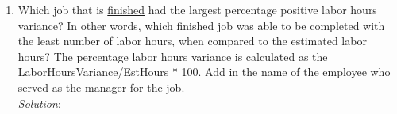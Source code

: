 \documentclass{article}
\begin{document}
\begin{enumerate}

  \newpage
  \item Which job that is \underline{finished} had the largest percentage positive labor hours variance? In other words, which finished job was able to be completed with the least number of labor hours, when compared to the estimated labor hours? The percentage labor hours variance is calculated as the LaborHoursVariance/EstHours * 100. Add in the name of the employee who served as the manager for the job.\\
  \textit{Solution}:
  \begin{verbatim}

  \end{verbatim}



\end{enumerate}
\end{document}
